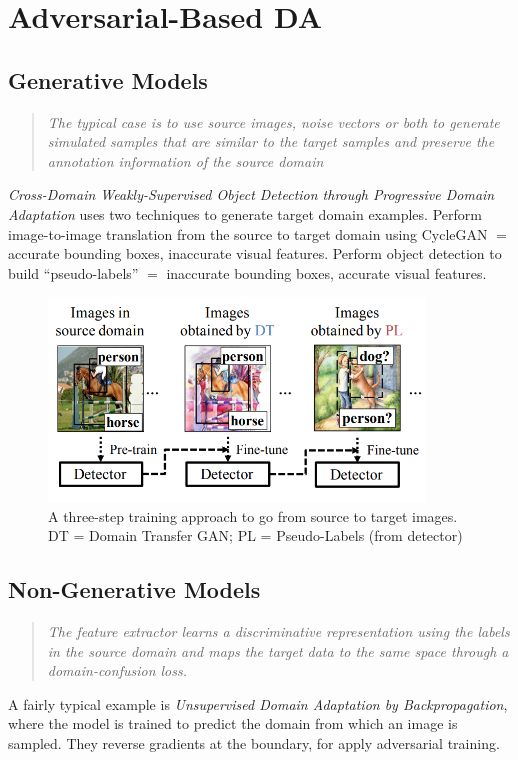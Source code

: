 \documentclass{report}
\newcommand{\quoteit}[1]{\begin{quote}\textit{#1}\end{quote}}
\begin{document}
\section{Adversarial-Based DA}

\subsection{Generative Models}
\quoteit{The typical case is to use source images, noise vectors or both to generate simulated samples that are similar to the target samples and preserve the annotation information of the source domain}
\textit{Cross-Domain Weakly-Supervised Object Detection through Progressive Domain Adaptation}\parencite{crossdomainweakly} uses two techniques to generate target domain examples. Perform image-to-image translation from the source to target domain using CycleGAN $=$ accurate bounding boxes, inaccurate visual features. Perform object detection to build ``pseudo-labels'' $=$ inaccurate bounding boxes, accurate visual features. 
\begin{figure}
	\centering
	\includegraphics[width=10cm]{imgs/crossdomainweakly}
	\caption{A three-step training approach to go from source to target images. DT = Domain Transfer GAN; PL = Pseudo-Labels (from detector)}
	\label{fig:crossdomainweakly}
\end{figure}

\subsection{Non-Generative Models}
\quoteit{The feature extractor learns a discriminative representation using the labels in the source domain and maps the target data to the same space through a domain-confusion loss.}
A fairly typical example is \textit{Unsupervised Domain Adaptation by Backpropagation}\parencite{unsuperviseddomainadaptation}, where the model is trained to predict the domain from which an image is sampled. They reverse gradients at the boundary, for apply adversarial training. \\
\end{document}
